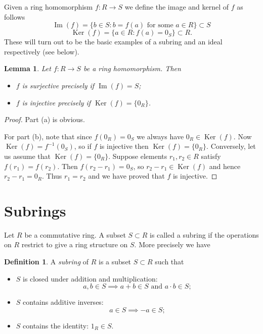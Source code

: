 \documentclass [12pt,oneside,a4paper,mathscr]{amsart}
\newtheorem{lemma}[thm]{Lemma}
\theoremstyle{definition}
\newtheorem{defn}[thm]{Definition}
\newcommand{\im}{\operatorname{Im}}
\renewcommand{\ker}{\operatorname{Ker}}
\begin{document}
Given a ring homomorphism $f\colon R \to S$ we define the image and kernel of $f$ as follows
\[\im(f) = \{b\in S: b=f(a)\text{ for some } a\in R \}\subset S\]
\[\ker(f)=\{a\in R: f(a)=0_S\}\subset R.\]
These will turn out to be the basic examples of a subring and an ideal respectively  (see below).

\begin{lemma}
Let $f\colon R \to S$ be a ring homomorphism. Then
\begin{itemize}
\item[(a)] $f$  is surjective precisely if $\im(f)=S$; 
\smallskip
\item[(b)] $f$  is injective precisely if $\ker(f)=\{0_R\}$.
\end{itemize}
\end{lemma}

\begin{proof}
Part (a)  is obvious.

For part (b), note that since $f(0_R)=0_S$ we always have $0_R\in \ker(f)$. Now $\ker(f)=f^{-1}(0_S)$, so if $f$ is injective then $\ker(f)=\{0_R\}$. Conversely, let us assume that   $\ker(f)=\{0_R\}$. Suppose elements $r_1,r_2\in R$ satisfy $f(r_1)=f(r_2)$. Then $f(r_2-r_1)=0_S$, so $r_2-r_1\in \ker(f)$ and hence $r_2-r_1=0_R$. Thus  $r_1=r_2$ and we have proved that $f$ is injective.
\end{proof}





\section{Subrings}



Let $R$ be a commutative ring. A subset $S\subset R$ is called a subring if the operations on $R$ restrict to give a ring structure on $S$. More precisely we have

\begin{defn}
\label{subring}
A \emph{subring} of $R$ is a subset $S\subset R$ such that
\begin{itemize}
\item[(a)] $S$ is closed under addition and multiplication:
\[a,b \in S \implies a+b \in S \text{ and } a\cdot b \in S;\]
\item[(b)] $S$ contains additive inverses:
\[a\in S \implies -a \in S;\] 
\item[(c)] $S$ contains 
the identity: $1_R\in S$.
\end{itemize}
\end{defn}
\end{document}
